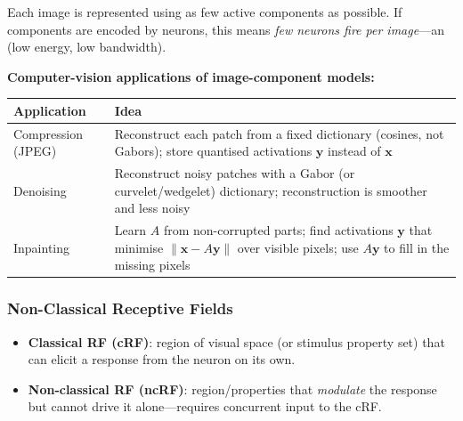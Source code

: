 \begin{defbox}
Each image is represented using as few active components as possible. If components are encoded by neurons, this means \emph{few neurons fire per image}---an  (low energy, low bandwidth).
\end{defbox}

\separator

\textbf{Computer-vision applications of image-component models:}

\begin{center}
\renewcommand{\arraystretch}{1.3}
\begin{tabular}{@{} l p{9cm} @{}}
\toprule
\textbf{Application} & \textbf{Idea} \\
\midrule
Compression (JPEG) & Reconstruct each patch from a fixed dictionary (cosines, not Gabors); store quantised activations $\mathbf{y}$ instead of $\mathbf{x}$ \\
Denoising & Reconstruct noisy patches with a Gabor (or curvelet/wedgelet) dictionary; reconstruction is smoother and less noisy \\
Inpainting & Learn $A$ from non-corrupted parts; find activations $\mathbf{y}$ that minimise $\|\mathbf{x}-A\mathbf{y}\|$ over visible pixels; use $A\mathbf{y}$ to fill in the missing pixels \\
\bottomrule
\end{tabular}
\end{center}

\bigseparator

\subsubsection{Non-Classical Receptive Fields}

\begin{defbox}
\begin{itemize}
  \item \textbf{Classical RF (cRF)}: region of visual space (or stimulus property set) that can elicit a response from the neuron on its own.
  \item \textbf{Non-classical RF (ncRF)}: region/properties that \emph{modulate} the response but cannot drive it alone---requires concurrent input to the cRF.
\end{itemize}
\end{defbox}

